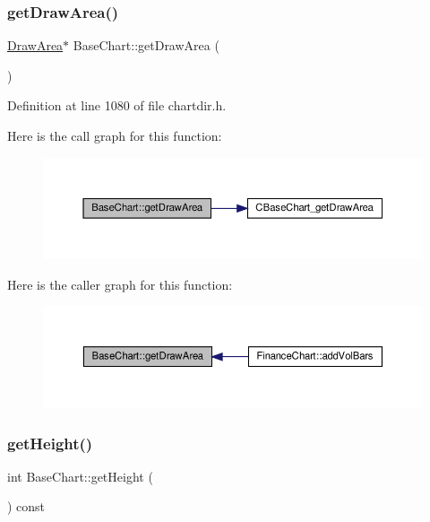 \subsubsection{\texorpdfstring{get\+Draw\+Area()}{getDrawArea()}}
{\footnotesize\ttfamily \hyperlink{class_draw_area}{Draw\+Area}$\ast$ Base\+Chart\+::get\+Draw\+Area (\begin{DoxyParamCaption}{ }\end{DoxyParamCaption})\hspace{0.3cm}{\ttfamily [inline]}}



Definition at line 1080 of file chartdir.\+h.

Here is the call graph for this function\+:
\nopagebreak
\begin{figure}[H]
\begin{center}
\leavevmode
\includegraphics[width=350pt]{class_base_chart_aa9314241244d1361b8cf0bac3e2242dd_cgraph}
\end{center}
\end{figure}
Here is the caller graph for this function\+:
\nopagebreak
\begin{figure}[H]
\begin{center}
\leavevmode
\includegraphics[width=350pt]{class_base_chart_aa9314241244d1361b8cf0bac3e2242dd_icgraph}
\end{center}
\end{figure}
\mbox{\label{class_base_chart_a2f337248bcc2c96d9d9b740d1b5752ee}} 
\subsubsection{\texorpdfstring{get\+Height()}{getHeight()}}
{\footnotesize\ttfamily int Base\+Chart\+::get\+Height (\begin{DoxyParamCaption}{ }\end{DoxyParamCaption}) const\hspace{0.3cm}{\ttfamily [inline]}}




